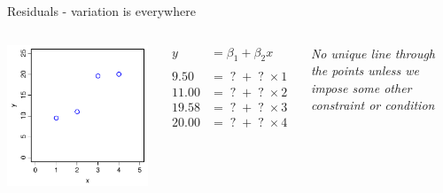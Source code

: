 \documentclass[xcolor=x11names,compress]{beamer}
\renewcommand{\(}{\begin{columns}}
\renewcommand{\)}{\end{columns}}
\newcommand{\<}[1]{\begin{column}{#1}}
\renewcommand{\>}{\end{column}}
\begin{document}
    
\begin{frame}{Residuals - variation is everywhere}

    \begin{columns}[T]
    
            \includegraphics[width=\textwidth]{Error.pdf}
            
            \begin{align*}
              y  &= \beta_1 + \beta_2 x \\
              \\
              9.50  &= \;?\; + \;?\; \times 1 \\
              11.00 &= \;?\; + \;?\; \times 2 \\
              19.58 &= \;?\; + \;?\; \times 3 \\
              20.00 &= \;?\; + \;?\; \times 4   
            \end{align*}
            
            \begin{center}
             {\it No unique line through the points unless we impose some other 
             constraint or condition}
            \end{center}
             
    \end{columns}
    \end{frame}
    
\end{document}
